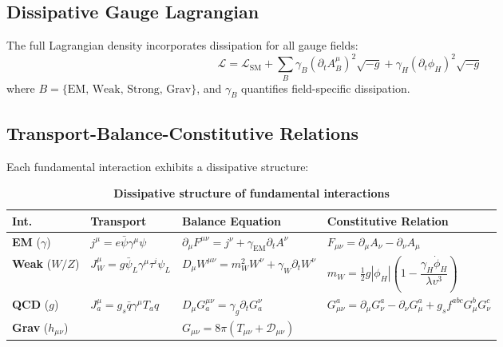 \documentclass[12pt, a4paper]{article}
\begin{document}
\subsection{Dissipative Gauge Lagrangian}
The full Lagrangian density incorporates dissipation for all gauge fields:
\begin{equation}
\mathcal{L} = \mathcal{L}_{\text{SM}} + \sum_{B} \gamma_B (\partial_t A_B^\mu)^2 \sqrt{-g} + \gamma_H (\partial_t \phi_H)^2 \sqrt{-g}
\end{equation}
where $B = \{\text{EM, Weak, Strong, Grav}\}$, and $\gamma_B$ quantifies field-specific dissipation.

\subsection{Transport-Balance-Constitutive Relations}
Each fundamental interaction exhibits a dissipative structure:
\begin{table}[htbp]
\centering
\footnotesize %
\setlength{\tabcolsep}{4pt} %
\renewcommand{\arraystretch}{1.5} %
\caption{\textbf{Dissipative structure of fundamental interactions}}
\begin{tabular}{@{} P{1.2cm} P{3.0cm} P{3.8cm} P{4.0cm} @{}} %
\toprule
\textbf{Int.} & 
\textbf{Transport} & 
\textbf{Balance Equation} & 
\textbf{Constitutive Relation} \\
\midrule

\textbf{EM} ($\gamma$) & 
$j^\mu = e\bar{\psi}\gamma^\mu\psi$ & 
$\partial_\mu F^{\mu\nu} = j^\nu + \gamma_{\text{EM}} \partial_t A^\nu$ & 
$F_{\mu\nu} = \partial_\mu A_\nu - \partial_\nu A_\mu$ \\

\textbf{Weak} ($W/Z$) & 
$J^\mu_{W} = g \bar{\psi}_L \gamma^\mu \tau^i \psi_L$ & 
$D_\mu W^{\mu\nu} = m_W^2 W^\nu + \gamma_W \partial_t W^\nu$ & 
$m_W = \frac{1}{2}g|\phi_H|\left(1 - \dfrac{\gamma_H \dot{\phi}_H}{\lambda v^3}\right)$ \\

\textbf{QCD} ($g$) & 
$J_a^\mu = g_s \bar{q} \gamma^\mu T_a q$ & 
$D_\mu G^{\mu\nu}_a = \gamma_g \partial_t G_a^\nu$ & 
$G_{\mu\nu}^a = \partial_\mu G_\nu^a - \partial_\nu G_\mu^a + g_s f^{abc} G_\mu^b G_\nu^c$ \\

\textbf{Grav} ($h_{\mu\nu}$) & 
 & 
$G_{\mu\nu} = 8\pi (T_{\mu\nu} + \mathcal{D}_{\mu\nu})$ & 
 \\
\bottomrule
\end{tabular}
\end{table}
\end{document}
